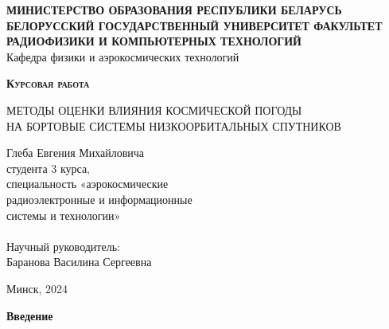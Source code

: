\documentclass[12pt, a4paper]{extreport}
\begin{document}
\begin{titlepage}
	\begin{center}
		\Large \textbf{МИНИСТЕРСТВО ОБРАЗОВАНИЯ РЕСПУБЛИКИ БЕЛАРУСЬ БЕЛОРУССКИЙ ГОСУДАРСТВЕННЫЙ УНИВЕРСИТЕТ
			ФАКУЛЬТЕТ РАДИОФИЗИКИ И КОМПЬЮТЕРНЫХ ТЕХНОЛОГИЙ
		} \\
		Кафедра физики и аэрокосмических технологий
	\end{center}

	\vspace{5em}

	\begin{center}
		\Huge \textsc{\textbf{Курсовая работа}}
	\end{center}

	\begin{center}
		\Large МЕТОДЫ ОЦЕНКИ ВЛИЯНИЯ КОСМИЧЕСКОЙ ПОГОДЫ \\
		НА БОРТОВЫЕ СИСТЕМЫ НИЗКООРБИТАЛЬНЫХ СПУТНИКОВ
	\end{center}

	\vspace{2em}

	\hfill
	\parbox{14em}{
		Глеба Евгения Михайловича \\
		студента 3 курса, \\
		специальность «аэрокосмические \\
		радиоэлектронные и информационные \\
		системы и технологии» \\
		\\
		Научный руководитель: \\
		Баранова Василина Сергеевна \\
	}


	\begin{center}
		Минск, 2024
	\end{center}

\end{titlepage}

{\Large \textbf{Введение}}
\end{document}
